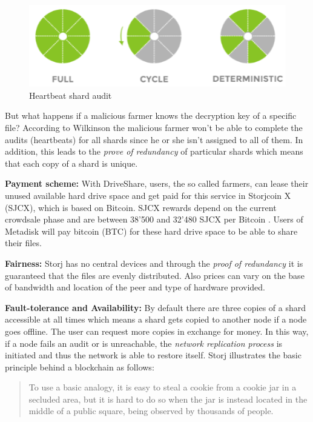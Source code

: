 	\begin{figure}[ht]
		\begin{center}
		\includegraphics[scale=0.8]{Talk5/storj_heartbeat.PNG}
		\end{center}
		\caption{Heartbeat shard audit \cite{storj:PDF}}
		\label{storj_heartbeat}
	\end{figure}

But what happens if a malicious farmer knows the decryption key of a specific file? According to Wilkinson the malicious farmer won't be able to complete the audits (heartbeats) for all shards since he or she isn't assigned to all of them. In addition, this leads to the \textit{prove of redundancy} of particular shards which means that each copy of a shard is unique.

\textbf{Payment scheme:} With DriveShare, users, the so called farmers, can lease their unused available hard drive space and get paid for this service in Storjcoin X (SJCX), which is based on Bitcoin. SJCX rewards depend on the current crowdsale phase and are between 38'500 and 32'480 SJCX per Bitcoin \cite{storj:crowdsale}. Users of Metadisk will pay bitcoin (BTC) for these hard drive space to be able to share their files.

\textbf{Fairness:} Storj has no central devices and through the \textit{proof of redundancy} it is guaranteed that the files are evenly distributed. Also prices can vary on the base of bandwidth and location of the peer and type of hardware provided.

\textbf{Fault-tolerance and Availability:} By default there are three copies of a shard accessible at all times which means a shard gets copied to another node if a node goes offline. The user can request more copies in exchange for money. In this way, if a node fails an audit or is unreachable, the \textit{network replication process} is initiated and thus the network is able to restore itself. Storj illustrates the basic principle behind a blockchain as follows:

\begin{quotation}
To use a basic analogy, it is easy to steal a cookie from a cookie jar in a secluded area, but it is hard to do so when the jar is instead located in the middle of a public square, being observed by thousands of people. \cite{storj:PDF}
\end{quotation}

